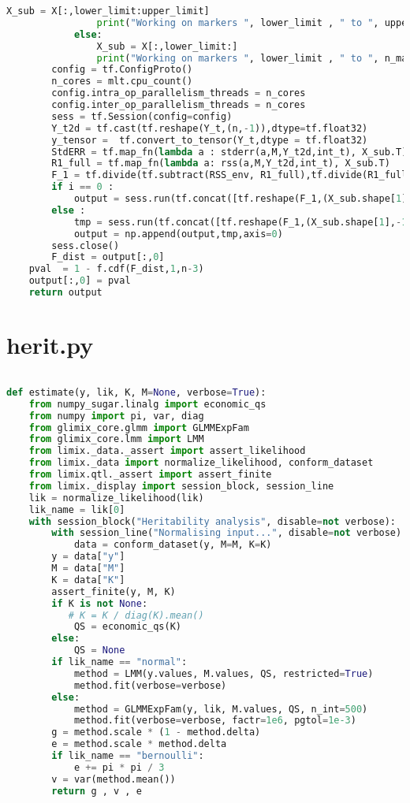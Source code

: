 \begin{lstlisting}[language=Python]
                X_sub = X[:,lower_limit:upper_limit]
                print("Working on markers ", lower_limit , " to ", upper_limit, " of ", n_marker )    
            else:
                X_sub = X[:,lower_limit:]
                print("Working on markers ", lower_limit , " to ", n_marker, " of ", n_marker )    
        config = tf.ConfigProto()
        n_cores = mlt.cpu_count()
        config.intra_op_parallelism_threads = n_cores
        config.inter_op_parallelism_threads = n_cores
        sess = tf.Session(config=config)                                             
        Y_t2d = tf.cast(tf.reshape(Y_t,(n,-1)),dtype=tf.float32)                     
        y_tensor =  tf.convert_to_tensor(Y_t,dtype = tf.float32)                                      
        StdERR = tf.map_fn(lambda a : stderr(a,M,Y_t2d,int_t), X_sub.T)              
        R1_full = tf.map_fn(lambda a: rss(a,M,Y_t2d,int_t), X_sub.T)
        F_1 = tf.divide(tf.subtract(RSS_env, R1_full),tf.divide(R1_full,(n-3)))
        if i == 0 :
            output = sess.run(tf.concat([tf.reshape(F_1,(X_sub.shape[1],-1)),StdERR],axis=1))
        else :
            tmp = sess.run(tf.concat([tf.reshape(F_1,(X_sub.shape[1],-1)),StdERR],axis=1))
            output = np.append(output,tmp,axis=0)
        sess.close()
        F_dist = output[:,0]
    pval  = 1 - f.cdf(F_dist,1,n-3)
    output[:,0] = pval
    return output 


  \end{lstlisting}

\section{herit.py}
\begin{lstlisting}[language=Python]
  
def estimate(y, lik, K, M=None, verbose=True):
    from numpy_sugar.linalg import economic_qs
    from numpy import pi, var, diag
    from glimix_core.glmm import GLMMExpFam
    from glimix_core.lmm import LMM
    from limix._data._assert import assert_likelihood
    from limix._data import normalize_likelihood, conform_dataset 
    from limix.qtl._assert import assert_finite
    from limix._display import session_block, session_line
    lik = normalize_likelihood(lik)
    lik_name = lik[0]
    with session_block("Heritability analysis", disable=not verbose):
        with session_line("Normalising input...", disable=not verbose):
            data = conform_dataset(y, M=M, K=K)
        y = data["y"]
        M = data["M"]
        K = data["K"]
        assert_finite(y, M, K)
        if K is not None:
           # K = K / diag(K).mean()
            QS = economic_qs(K)
        else:
            QS = None
        if lik_name == "normal":
            method = LMM(y.values, M.values, QS, restricted=True)
            method.fit(verbose=verbose)
        else:
            method = GLMMExpFam(y, lik, M.values, QS, n_int=500)
            method.fit(verbose=verbose, factr=1e6, pgtol=1e-3)
        g = method.scale * (1 - method.delta)
        e = method.scale * method.delta
        if lik_name == "bernoulli":
            e += pi * pi / 3
        v = var(method.mean())
        return g , v , e 


\end{lstlisting}